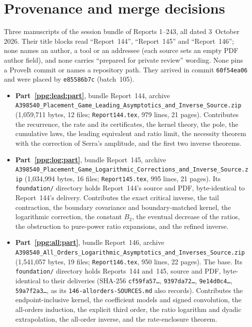 \documentclass[11pt,letterpaper]{article}
\theoremstyle{remark}\newtheorem{remark}[theorem]{Remark}
\numberwithin{equation}{section}
\newcommand{\file}[1]{\nolinkurl{#1}}
\begin{document}
\section*{Provenance and merge decisions}\label{ppg:sec:provenance}
Three manuscripts of the session bundle of Reports 1--243, all dated 3~October 2026. Their title blocks read ``Report~144'', ``Report~145'' and ``Report~146''; none names an author, a tool or an addressee (each source sets an empty PDF author field), and none carries ``prepared for private review'' wording. None pins a ProveIt commit or names a repository path. They arrived in commit \texttt{60f54ea06} and were placed by \texttt{e85586b7c} (batch~105).
\begin{itemize}
\item \textbf{Part~\ref{ppg:lead:part}}, bundle Report~144, archive \file{A398540_Placement_Game_Leading_Asymptotics_and_Inverse_Source.zip} (1,059,711 bytes, 12 files; \file{Report144.tex}, 979 lines, 21 pages). Contributes the recurrence, the rate and its certificates, the kernel theory, the pole, the cumulative laws, the leading equivalent and ratio limit, the necessity theorem with the correction of Serra's amplitude, and the first two inverse theorems.
\item \textbf{Part~\ref{ppg:log:part}}, bundle Report~145, archive \file{A398540_Placement_Game_Logarithmic_Corrections_and_Inverse_Source.zip} (1,034,994 bytes, 16 files; \file{Report145.tex}, 995 lines, 21 pages). Its \file{foundation/} directory holds Report~144's source and PDF, byte-identical to Report~144's delivery. Contributes the exact critical inverse, the tail contraction, the boundary covariance and boundary-matched kernel, the logarithmic correction, the constant $B_2$, the eventual decrease of the ratios, the obstruction to pure-power ratio expansions, and the refined inverse.
\item \textbf{Part~\ref{ppg:all:part}}, bundle Report~146, archive \file{A398540_All_Orders_Logarithmic_Asymptotics_and_Inverses_Source.zip} (1,541,057 bytes, 19 files; \file{Report146.tex}, 950 lines, 22 pages). The base. Its \file{foundation/} directory holds Reports~144 and~145, source and PDF, byte-identical to their deliveries (SHA-256 \texttt{cf59fa57\ldots}, \texttt{9397da72\ldots}, \texttt{9e14d0c4\ldots}, \texttt{59a7f2a3\ldots}, as its \file{146-allorders-SOURCES.md} also records). Contributes the endpoint-inclusive kernel, the coefficient models and signed convolution, the all-orders induction, the explicit third order, the ratio logarithm and dyadic extrapolation, the all-order inverse, and the rate-enclosure theorem.
\end{itemize}
\end{document}
